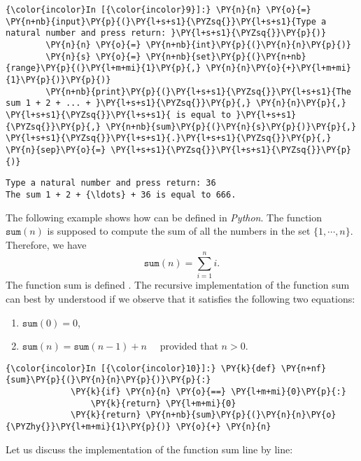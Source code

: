 \begin{Verbatim}[commandchars=\\\{\}]
{\color{incolor}In [{\color{incolor}9}]:} \PY{n}{n} \PY{o}{=} \PY{n+nb}{input}\PY{p}{(}\PY{l+s+s1}{\PYZsq{}}\PY{l+s+s1}{Type a natural number and press return: }\PY{l+s+s1}{\PYZsq{}}\PY{p}{)}
        \PY{n}{n} \PY{o}{=} \PY{n+nb}{int}\PY{p}{(}\PY{n}{n}\PY{p}{)}
        \PY{n}{s} \PY{o}{=} \PY{n+nb}{set}\PY{p}{(}\PY{n+nb}{range}\PY{p}{(}\PY{l+m+mi}{1}\PY{p}{,} \PY{n}{n}\PY{o}{+}\PY{l+m+mi}{1}\PY{p}{)}\PY{p}{)}
        \PY{n+nb}{print}\PY{p}{(}\PY{l+s+s1}{\PYZsq{}}\PY{l+s+s1}{The sum 1 + 2 + ... + }\PY{l+s+s1}{\PYZsq{}}\PY{p}{,} \PY{n}{n}\PY{p}{,} \PY{l+s+s1}{\PYZsq{}}\PY{l+s+s1}{ is equal to }\PY{l+s+s1}{\PYZsq{}}\PY{p}{,} \PY{n+nb}{sum}\PY{p}{(}\PY{n}{s}\PY{p}{)}\PY{p}{,} \PY{l+s+s1}{\PYZsq{}}\PY{l+s+s1}{.}\PY{l+s+s1}{\PYZsq{}}\PY{p}{,} \PY{n}{sep}\PY{o}{=} \PY{l+s+s1}{\PYZsq{}}\PY{l+s+s1}{\PYZsq{}}\PY{p}{)}
\end{Verbatim}

\begin{Verbatim}[commandchars=\\\{\}]
Type a natural number and press return: 36
The sum 1 + 2 + {\ldots} + 36 is equal to 666.
\end{Verbatim}

The following example shows how  can be defined in
\textsl{Python}. The function \(\texttt{sum}(n)\) is supposed to compute
the sum of all the numbers in the set \(\{1, \cdots, n\}\). Therefore, we have
 \[\texttt{sum}(n) = \sum\limits_{i=1}^n i. \]
The function sum is defined . The recursive
implementation of the function sum can best by understood if we observe
that it satisfies the following two equations:
\begin{enumerate}
\item $\texttt{sum}(0) = 0$, 
\item $\texttt{sum}(n) = \texttt{sum}(n-1) + n \quad$  provided that $n > 0$.
\end{enumerate}

    \begin{Verbatim}[commandchars=\\\{\}]
{\color{incolor}In [{\color{incolor}10}]:} \PY{k}{def} \PY{n+nf}{sum}\PY{p}{(}\PY{n}{n}\PY{p}{)}\PY{p}{:}
             \PY{k}{if} \PY{n}{n} \PY{o}{==} \PY{l+m+mi}{0}\PY{p}{:}
                 \PY{k}{return} \PY{l+m+mi}{0}
             \PY{k}{return} \PY{n+nb}{sum}\PY{p}{(}\PY{n}{n}\PY{o}{\PYZhy{}}\PY{l+m+mi}{1}\PY{p}{)} \PY{o}{+} \PY{n}{n}
\end{Verbatim}
 Let us discuss the implementation of the function sum line by line:

